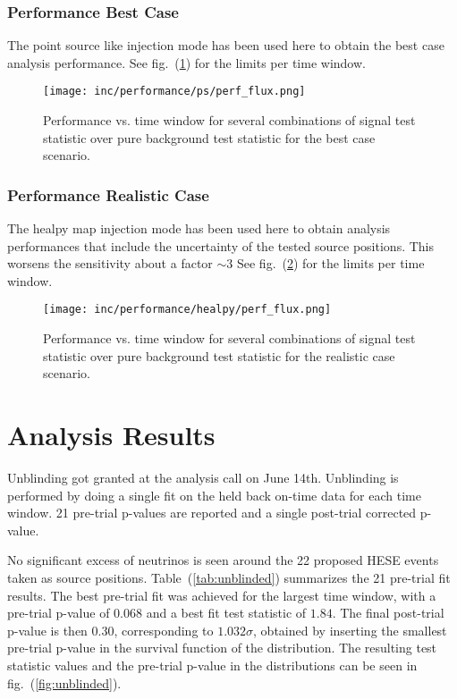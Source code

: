 \subsubsection*{Performance Best Case}
The point source like injection mode has been used here to obtain the best case analysis performance.
See fig.~(\ref{fig:performance_ps_flux}) for the limits per time window.
\begin{figure}[htbp]
  \centering
  \texttt{[image: inc/performance/ps/perf\_flux.png]}
  \caption{Performance vs. time window for several combinations of signal test statistic over pure background test statistic for the best case scenario.}
  \label{fig:performance_ps_flux}
\end{figure}

\subsubsection*{Performance Realistic Case}
The healpy map injection mode has been used here to obtain analysis performances that include the uncertainty of the tested source positions.
This worsens the sensitivity about a factor $\sim 3$
See fig.~(\ref{fig:performance_healpy_flux}) for the limits per time window.
\begin{figure}[htbp]
  \centering
  \texttt{[image: inc/performance/healpy/perf\_flux.png]}
  \caption{Performance vs. time window for several combinations of signal test statistic over pure background test statistic for the realistic case scenario.}
  \label{fig:performance_healpy_flux}
\end{figure}



\section{Analysis Results}
Unblinding got granted at the analysis call on June 14th.
Unblinding is performed by doing a single fit on the held back on-time data for each time window.
21 pre-trial p-values are reported and a single post-trial corrected p-value.

No significant excess of neutrinos is seen around the 22 proposed HESE events taken as source positions.
Table~(\ref{tab:unblinded}) summarizes the 21 pre-trial fit results.
The best pre-trial fit was achieved for the largest time window, with a pre-trial p-value of $0.068$ and a best fit test statistic of $1.84$.
The final post-trial p-value is then $0.30$, corresponding to $1.032\sigma$, obtained by inserting the smallest pre-trial p-value in the survival function of the distribution.
The resulting test statistic values and the pre-trial p-value in the distributions can be seen in fig.~(\ref{fig:unblinded}).

